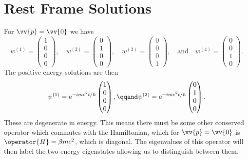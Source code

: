 \documentclass[fleqn]{NotesClass}
\newcommand*{\e}{\mathrm{e}}
\newcommand*{\hamiltonian}{H}
\begin{document}
    \section{Rest Frame Solutions}
    For \(\vv{p} = \vv{0}\) we have
    \begin{equation}
        w^{(1)} = 
        \begin{pmatrix}
            1\\ 0\\ 0\\ 0
        \end{pmatrix}
        , \quad
        w^{(2)} = 
        \begin{pmatrix}
            0\\ 1\\ 0\\ 0
        \end{pmatrix}
        , \quad
        w^{(3)} = 
        \begin{pmatrix}
            0\\ 0\\ 0\\ 1
        \end{pmatrix}
        , \quad\text{and}\quad w^{(4)} = 
        \begin{pmatrix}
            0\\ 0\\ 1\\ 0
        \end{pmatrix}
        .
    \end{equation}
    The positive energy solutions are then
    \begin{equation}
        \psi^{(1)} = \e^{-imc^2t/\hbar} 
        \begin{pmatrix}
            1\\ 0\\ 0\\ 0
        \end{pmatrix}
        , \qqand \psi^{(2)} = \e^{-imc^2t/\hbar}
        \begin{pmatrix}
            0\\ 1\\ 0\\ 0
        \end{pmatrix}
        .
    \end{equation}
    These are degenerate in energy.
    This means there must be some other conserved operator which commutes with the Hamiltonian, which for \(\vv{p} = \vv{0}\) is \(\operator{\hamiltonian} = \beta mc^2\), which is diagonal.
    The eigenvalues of this operator will then label the two energy eigenstates allowing us to distinguish between them.
    
\end{document}
